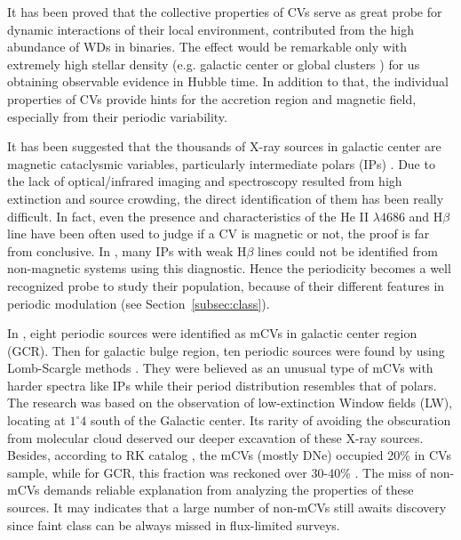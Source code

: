 \documentclass[fleqn,usenatbib]{mnras}
\begin{document}
It has been proved that the collective properties of CVs serve as great probe for dynamic interactions of their local environment, contributed from the high abundance of WDs in binaries. The effect would be remarkable only with extremely high stellar density (e.g. galactic center or global clusters \citep{2019ApJ...876...59C}) for us obtaining observable evidence in Hubble time. 
In addition to that, the individual properties of CVs provide hints for the accretion region and magnetic field, especially from their periodic variability.

It has been suggested that the thousands of X-ray sources in galactic center are magnetic cataclysmic variables, particularly intermediate
polars (IPs) \citep{2009ApJS..181..110M,2018ApJS..235...26Z}. Due to the lack of optical/infrared imaging and spectroscopy resulted from high extinction and source crowding, the direct identification of them has been really difficult.
In fact, even the presence and characteristics of the He II $\lambda 4686$ and H$\beta$ line have been often used to judge if a CV is magnetic or not, the proof is far from conclusive. In \cite{1992PhDT.......119S}, many IPs with weak H$\beta$ lines could not be identified from non-magnetic systems using this diagnostic. 
Hence the periodicity becomes a well recognized probe to study their population, because of their different features in periodic modulation (see Section~\ref{subsec:class}).  

In \citet{2003ApJ...599..465M}, eight periodic sources were identified as mCVs in galactic center region (GCR). Then for galactic bulge region, ten periodic sources were found by using Lomb-Scargle methods \citep{2012ApJ...746..165H}. They were believed as an unusual type of mCVs with harder spectra like IPs while their period distribution resembles that of polars. The research was based on the observation of low-extinction Window fields (LW), locating at $1^{\circ}4$ south of the Galactic center. Its rarity of avoiding the obscuration from molecular cloud deserved our deeper excavation of these X-ray sources. 
Besides, according to RK catalog \citep{2003A&A...404..301R}, the mCVs (mostly DNe) occupied 20\% in CVs sample, while for GCR, this fraction was reckoned over 30-40\% \citep{2016ApJ...826..160H,2012ApJ...746..165H}. The miss of non-mCVs demands reliable explanation from analyzing the properties of these sources. It may indicates that a large number of non-mCVs still awaits discovery since faint class can be always missed in flux-limited surveys.
\end{document}
